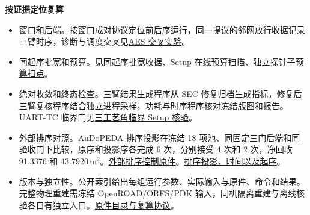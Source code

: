 \documentclass[10pt,a4paper,fontset=windows]{ctexart}
\newcommand{\Evidence}[2]{\href{https://github.com/Toylog123/FAECO/blob/f0fe992b9ce44b8368b620d06b8d95a56179347c/project_docs/evidence/#1}{#2}}
\newcommand{\Vfive}[2]{\Evidence{tcad_v5_revision_20261126/#1}{#2}}
\begin{document}
\noindent\textbf{按证据定位复算}

\begin{itemize}
\item 窗口和后端。按\Evidence{tcad_boxed_drc_20261126/REPORT.md}{窗口成对协议}定位前后序运行，\Evidence{tcad_geo_neighbor_20261125/AES_GEO_VS_ONLINE_VERIFIED.json}{同一提议的邻网放行收据}记录三臂时序，诊断与调度交叉见\Evidence{tcad_ibex_20261123/AES_FACTORIAL_REPORT.md}{AES 交叉实验}。
\item 同起序批宽和预算。见\Vfive{V5_REVIEW_MATCHED_BATCH_VERIFIED.json}{同起序批宽收据}、\Vfive{V5_STEP3_MULTIBUDGET_VERIFIED.json}{Setup 在线预算扫描}、\Vfive{V5_STEP4_PROBE_SENS_VERIFIED.json}{独立探针子预算扫点}。
\item 绝对收敛和终态检查。\Vfive{generate_stage5_table12.py}{三臂结果生成程序}从 SEC 修复归档生成指标，\Vfive{verify_stage5_sec_fixed_replay.py}{修复后三臂复核程序}结合独立进程采样，\Vfive{verify_r4_stage5_power_trace.py}{功耗与时序程序}核对冻结版图和报告。UART-TC 临界门见\Vfive{V5_REVIEW_SETUP_FLOOR_VERIFIED.json}{三工艺角临界 Setup 核验}。
\item 外部排序对照。AuDoPEDA 排序投影在冻结 18 项池、同固定三门后端和同验收门下比较，原序和投影序各完成 6 次，分别接受 4 次和 2 次，净回收 91.3376 和 43.7920\,\textmu m$^2$。\Vfive{V5_AUDOPEDA_RANK_CONTROL_ORIGINALS.zip}{外部排序控制原件}。\Vfive{REVIEW_SUPPLEMENT.md}{排序投影、时间以及起序}。
\item 版本与独立性。公开索引给出每组运行参数、实际输入与原件、命令和结果。完整物理重建需冻结 OpenROAD/ORFS/PDK 输入，同机隔离重建与离线核验各自有独立入口。\Vfive{REPRODUCIBILITY.md}{原件目录与复算协议}。
\end{itemize}
\end{document}
